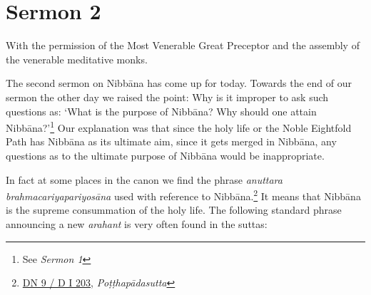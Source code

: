 \chapter{Sermon 2}







\NibbanaOpeningQuote

With the permission of the Most Venerable Great Preceptor and the assembly of the venerable meditative monks.

The second sermon on Nibbāna has come up for today. Towards the end of our sermon the other day we raised the point: Why is it improper to ask such questions as: `What is the purpose of Nibbāna? Why should one attain Nibbāna?'\footnote{See \emph{Sermon 1}} Our explanation was that since the holy life or the Noble Eightfold Path has Nibbāna as its ultimate aim, since it gets merged in Nibbāna, any questions as to the ultimate purpose of Nibbāna would be inappropriate.

In fact at some places in the canon we find the phrase \emph{anuttara brahmacariyapariyosāna} used with reference to Nibbāna.\footnote{\href{https://suttacentral.net/dn9/pli/ms}{DN 9 / D I 203}, \emph{Poṭṭhapādasutta}} It means that Nibbāna is the supreme consummation of the holy life. The following standard phrase announcing a new \emph{arahant} is very often found in the suttas:

